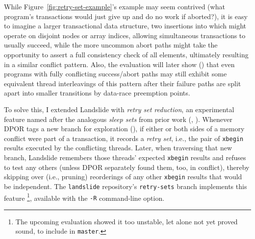 While Figure~\ref{fig:retry-set-example}'s example may seem contrived
(what program's transactions would just give up and do no work if aborted?),
it is easy to imagine a larger transactional data structure,
two insertions into which might operate on disjoint nodes or array indices,
allowing simultaneous transactions to usually succeed,
while the more uncommon abort paths might take the opportunity to assert a full consistency check of all elements,
ultimately resulting in a similar conflict pattern.
Also, the evaluation will later show
(\sect{\ref{sec:tm-eval-retrysets}})
that even programs with fully conflicting success/abort paths
may still exhibit some equivalent thread interleavings of this pattern
after their failure paths are split apart into smaller transitions by data-race preemption points.

To solve this,
I extended Landslide
with {\em retry set reduction},
an experimental feature named after the analogous {\em sleep sets} from prior work
(\cite{partial-order-methods,dpor,optimal-dpor}, \sect{\ref{sec:landslide-sleepsets}}).
Whenever DPOR tags a new branch for exploration (\sect{\ref{sec:landslide-explore}}),
if either or both sides of a memory conflict were part of a transaction,
it records a {\em retry set},
i.e., the pair of {\tt xbegin} results executed by the conflicting threads.
Later, when traversing that new branch,
Landslide remembers those threads' expected {\tt xbegin} results
and refuses to test any others
(unless DPOR separately found them, too, in conflict),
thereby skipping over (i.e., pruning) reorderings of any other {\tt xbegin} results that would be independent.
The {\tt landslide} repository's {\tt retry-sets} branch implements this feature%
\footnote{The upcoming evaluation showed it too unstable, let alone not yet proved sound, to include in {\tt master}.},
available with the {\tt -R} command-line option.


